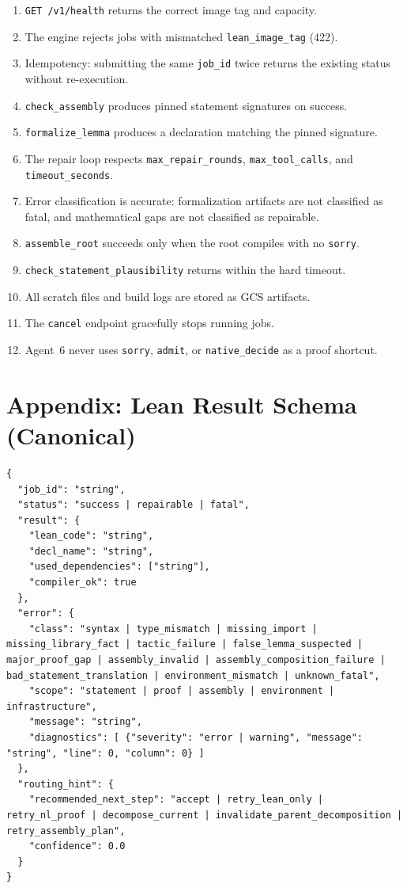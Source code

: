 \documentclass[11pt,a4paper]{article}
\begin{document}
\begin{enumerate}[leftmargin=2em]
  \item \texttt{GET /v1/health} returns the correct image tag and capacity.
  \item The engine rejects jobs with mismatched \texttt{lean\_image\_tag} (422).
  \item Idempotency: submitting the same \texttt{job\_id} twice returns the existing status without re-execution.
  \item \texttt{check\_assembly} produces pinned statement signatures on success.
  \item \texttt{formalize\_lemma} produces a declaration matching the pinned signature.
  \item The repair loop respects \texttt{max\_repair\_rounds}, \texttt{max\_tool\_calls}, and \texttt{timeout\_seconds}.
  \item Error classification is accurate: formalization artifacts are not classified as fatal, and mathematical gaps are not classified as repairable.
  \item \texttt{assemble\_root} succeeds only when the root compiles with no \texttt{sorry}.
  \item \texttt{check\_statement\_plausibility} returns within the hard timeout.
  \item All scratch files and build logs are stored as GCS artifacts.
  \item The \texttt{cancel} endpoint gracefully stops running jobs.
  \item Agent~6 never uses \texttt{sorry}, \texttt{admit}, or \texttt{native\_decide} as a proof shortcut.
\end{enumerate}

\appendix
\section{Appendix: Lean Result Schema (Canonical)}

\begin{lstlisting}
{
  "job_id": "string",
  "status": "success | repairable | fatal",
  "result": {
    "lean_code": "string",
    "decl_name": "string",
    "used_dependencies": ["string"],
    "compiler_ok": true
  },
  "error": {
    "class": "syntax | type_mismatch | missing_import | missing_library_fact | tactic_failure | false_lemma_suspected | major_proof_gap | assembly_invalid | assembly_composition_failure | bad_statement_translation | environment_mismatch | unknown_fatal",
    "scope": "statement | proof | assembly | environment | infrastructure",
    "message": "string",
    "diagnostics": [ {"severity": "error | warning", "message": "string", "line": 0, "column": 0} ]
  },
  "routing_hint": {
    "recommended_next_step": "accept | retry_lean_only | retry_nl_proof | decompose_current | invalidate_parent_decomposition | retry_assembly_plan",
    "confidence": 0.0
  }
}
\end{lstlisting}
\end{document}
